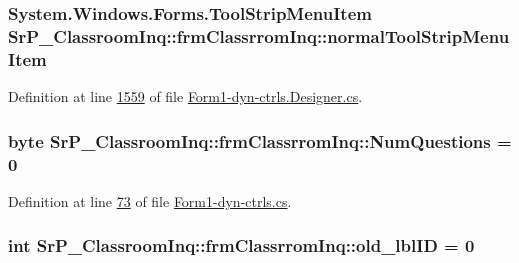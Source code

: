 \hypertarget{class_sr_p___classroom_inq_1_1frm_classrrom_inq_a19933124599a8ff87bd0d7fd10808c4e}{
\subsubsection[{normal\-Tool\-Strip\-Menu\-Item}]{\setlength{\rightskip}{0pt plus 5cm}\-System.\-Windows.\-Forms.\-Tool\-Strip\-Menu\-Item {\bf \-Sr\-P\-\_\-\-Classroom\-Inq\-::frm\-Classrrom\-Inq\-::normal\-Tool\-Strip\-Menu\-Item}}}
\label{class_sr_p___classroom_inq_1_1frm_classrrom_inq_a19933124599a8ff87bd0d7fd10808c4e}


\-Definition at line \hyperlink{_form1-dyn-ctrls_8_designer_8cs_source_l01559}{1559} of file \hyperlink{_form1-dyn-ctrls_8_designer_8cs_source}{\-Form1-\/dyn-\/ctrls.\-Designer.\-cs}.

\hypertarget{class_sr_p___classroom_inq_1_1frm_classrrom_inq_a7e4d497088afdd32623b3b54749210a0}{
\subsubsection[{\-Num\-Questions}]{\setlength{\rightskip}{0pt plus 5cm}byte {\bf \-Sr\-P\-\_\-\-Classroom\-Inq\-::frm\-Classrrom\-Inq\-::\-Num\-Questions} = 0}}
\label{class_sr_p___classroom_inq_1_1frm_classrrom_inq_a7e4d497088afdd32623b3b54749210a0}


\-Definition at line \hyperlink{_form1-dyn-ctrls_8cs_source_l00073}{73} of file \hyperlink{_form1-dyn-ctrls_8cs_source}{\-Form1-\/dyn-\/ctrls.\-cs}.

\hypertarget{class_sr_p___classroom_inq_1_1frm_classrrom_inq_ac56e0f039ce0113331d9bdd322b30827}{
\subsubsection[{old\-\_\-lbl\-I\-D}]{\setlength{\rightskip}{0pt plus 5cm}int {\bf \-Sr\-P\-\_\-\-Classroom\-Inq\-::frm\-Classrrom\-Inq\-::old\-\_\-lbl\-I\-D} = 0}}
\label{class_sr_p___classroom_inq_1_1frm_classrrom_inq_ac56e0f039ce0113331d9bdd322b30827}


